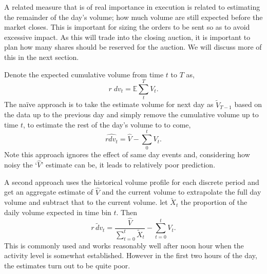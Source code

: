 A related measure that is of real importance in execution is related to estimating the remainder of the day's volume; how much volume are still expected before the market closes. This is important for sizing the orders to be sent so as to avoid excessive impact. As this will trade into the closing auction, it is important to plan how many shares should be reserved for the auction. We will discuss more of this in the next section.


Denote the expected cumulative volume from time $t$ to $T$ as,
	\begin{equation} \label{eq:rdv_1}
		r \;dv_t = \mathbb{E} \sum_t^T V_t.
	\end{equation}
The na\"ive approach is to take the estimate volume for next day as $\tilde{V}_{T-1}$  based on the data up to the previous day and simply remove the cumulative volume up to time $t$, to estimate the rest of the day's volume to to come,
	\begin{equation}\label{eq:rdv_2}
		\widehat{rdv_t}=  \hat{V} - \sum_0^t V_t.
	\end{equation}
Note this approach ignores the effect of same day events and, considering how noisy the `$\hat{V}$' estimate can be, it leads to relatively poor prediction.


A second approach uses the historical volume profile for each discrete period and get an aggregate estimate of $\hat{V}$ and the current volume to extrapolate the full day volume and subtract that to the current volume. let $\tilde{X}_t$ the proportion of the daily volume expected in time bin $t$. Then
	\begin{equation}\label{eq:rdv_3}
		\widetilde{r\,dv_t}= \dfrac{\hat{V}}{\sum_{t=0}^t \tilde{X}_t} - \sum_{t=0}^t V_t.
	\end{equation}
This is commonly used and works reasonably well after noon hour when the activity level is somewhat established. However in the first two hours of the day, the estimates turn out to be quite poor.


